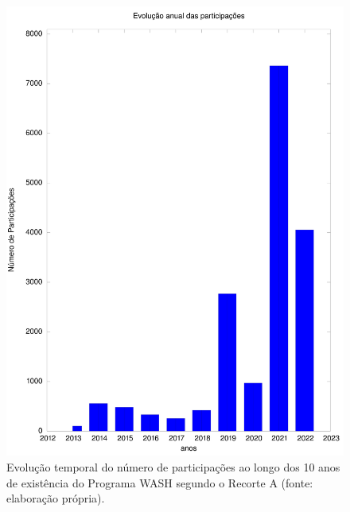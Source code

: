 \documentclass[
12pt,		%
openright,	%
twoside,  %
a4paper,			%
chapter=TITLE,		%
english,			%
french,				%
spanish,			%
brazil				%
]{USPSC-classe/USPSC}
\begin{document}
\captionsetup{format=plain}
\begin{figure}[max size={\textwidth}{\textheight}]

\centering


\begin{minipage}[b]{0.4\linewidth}
        \centering
                \includegraphics[width=1.0\linewidth]{../../imagens/output-participantes.jpeg}
                \caption{Evolu\c{c}\~ao temporal do n\'umero de participa\c{c}\~oes ao longo dos 10 anos de exist\^encia do Programa WASH segundo o Recorte A (fonte: elabora\c{c}\~ao pr\'opria).}
                \label{19699bcc5ab8317274249d6743d62534dbfb95fa}
\end{minipage}%
\hspace{0.5cm}
\begin{minipage}[b]{0.4\linewidth}
        \centering

\end{minipage}
\end{figure}
\end{document}
